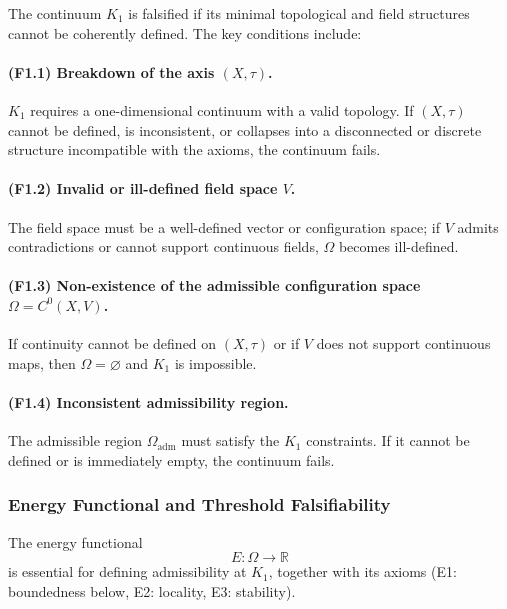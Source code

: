 The continuum $K_1$ is falsified if its minimal topological and field
structures cannot be coherently defined.  
The key conditions include:

\paragraph{(F1.1) Breakdown of the axis \texorpdfstring{$(X,\tau)$}{(X,\tau)}.}
$K_1$ requires a one-dimensional continuum with a valid topology.
If $(X,\tau)$ cannot be defined, is inconsistent, or collapses into a
disconnected or discrete structure incompatible with the axioms, the
continuum fails.

\paragraph{(F1.2) Invalid or ill-defined field space \texorpdfstring{$V$}{V}.}
The field space must be a well-defined vector or configuration space;
if $V$ admits contradictions or cannot support continuous fields,
$\Omega$ becomes ill-defined.

\paragraph{(F1.3) Non-existence of the admissible configuration space \texorpdfstring{$\Omega=C^0(X,V)$}{\Omega=C^0(X,V)}.}
If continuity cannot be defined on $(X,\tau)$ or if $V$ does not support
continuous maps, then $\Omega=\varnothing$ and $K_1$ is impossible.

\paragraph{(F1.4) Inconsistent admissibility region.}
The admissible region $\Omega_{\mathrm{adm}}$ must satisfy the $K_1$
constraints.
If it cannot be defined or is immediately empty, the continuum fails.



\subsubsection{Energy Functional and Threshold Falsifiability}

The energy functional
\[
E : \Omega \to \mathbb{R}
\]
is essential for defining admissibility at $K_1$, together with its axioms
(E1: boundedness below, E2: locality, E3: stability).

